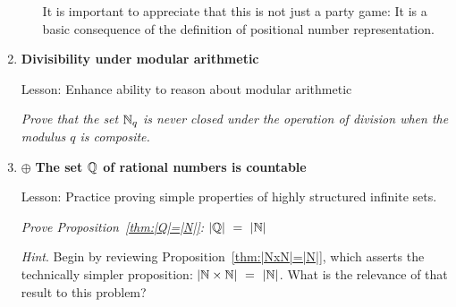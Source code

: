 \begin{enumerate}
\begin{enumerate}
It is important to appreciate that this is not just a party game: It is a basic consequence of the definition of positional number representation.
   \end{enumerate}

\medskip\item
{\bf Divisibility under modular arithmetic}

{\sc Lesson:} Enhance ability to reason about modular arithmetic

\smallskip

{\em Prove that the set $\mathbb{N}_q$ is {\em never} closed under the operation of division when the modulus $q$ is composite.}


\medskip\item
$\oplus$
{\bf The set $\mathbb{Q}$ of rational numbers is countable}


{\sc Lesson:} Practice proving simple properties of highly structured infinite sets.

\smallskip

{\em Prove Proposition~\ref{thm:|Q|=|N|}: $|\mathbb{Q}| \ = \ |\mathbb{N}|$}

\smallskip

{\em Hint}.  Begin by reviewing Proposition~\ref{thm:|NxN|=|N|}, which asserts the technically simpler proposition: $|\mathbb{N} \times \mathbb{N}| \ = \ |\mathbb{N}|$.  What is the relevance of that result to this problem?

\end{enumerate}

